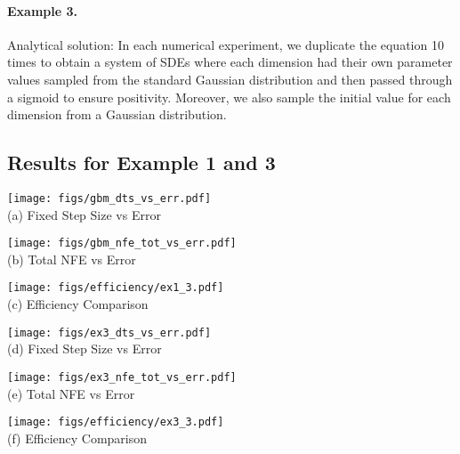 \documentclass[twoside]{article}
\begin{document}
\paragraph{Example 3.}
Analytical solution:
In each numerical experiment, we duplicate the equation 10 times to obtain a system of SDEs where each dimension had their own parameter values sampled from the standard Gaussian distribution and then passed through a sigmoid to ensure positivity. Moreover, we also sample the initial value for each dimension from a Gaussian distribution.  \subsection{Results for Example 1 and 3}\label{app:test_problem_results}

\begin{figure*}[ht]\label{fig:additional_numerical_study}
\begin{minipage}[t]{0.333\linewidth}
\centering
{\texttt{[image: figs/gbm\_dts\_vs\_err.pdf]}} \\ \vspace{-0.10cm}
(a) \footnotesize{Fixed Step Size vs Error}
\end{minipage}
\begin{minipage}[t]{0.333\linewidth}
\centering
\texttt{[image: figs/gbm\_nfe\_tot\_vs\_err.pdf]} \\ \vspace{-0.10cm}
(b) \footnotesize{Total NFE vs Error}
\end{minipage}
\begin{minipage}[t]{0.333\linewidth}
\centering
\texttt{[image: figs/efficiency/ex1\_3.pdf]} \\ \vspace{-0.10cm}
(c) \footnotesize{Efficiency Comparison}
\end{minipage}
\begin{minipage}[t]{0.333\linewidth}
\centering
{\texttt{[image: figs/ex3\_dts\_vs\_err.pdf]}} \\ \vspace{-0.10cm}
(d) \footnotesize{Fixed Step Size vs Error}
\end{minipage}
\begin{minipage}[t]{0.333\linewidth}
\centering
\texttt{[image: figs/ex3\_nfe\_tot\_vs\_err.pdf]} \\ \vspace{-0.10cm}
(e) \footnotesize{Total NFE vs Error}
\end{minipage}
\begin{minipage}[t]{0.333\linewidth}
\centering
\texttt{[image: figs/efficiency/ex3\_3.pdf]} \\ \vspace{-0.10cm}
(f) \footnotesize{Efficiency Comparison}
\end{minipage}
\caption{
(a-c) Example 1. (d-f) Example 3.
}
\end{figure*}
\end{document}
